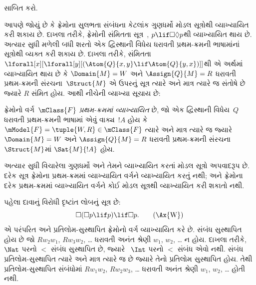 \begin{prob}
   સાબિત કરો.
\end{prob}
\endgroup

\begingroup
\makeatletter{}\makeatother


\label{guunit:OLP-0424}


આપણે જોયું છે કે ફ્રેમોના સુલભતા સંબંધના કેટલાંક
ગુણધર્મો મોડલ સૂત્રોથી વ્યાખ્યાયિત કરી શકાય છે.
દાખલા તરીકે, ફ્રેમોની સંમિતતા સૂત્ર~,
$p \lif \Box\Diamond
p$થી વ્યાખ્યાયિત થાય છે. અત્યાર સુધી મળેલી બધી
શરતો એક દ્વિસ્થાની વિધેય ધરાવતી
પ્રથમ-ક્રમની ભાષામાંનાં સૂત્રોથી
વ્યક્ત કરી શકાય છે. દાખલા તરીકે, સંમિતતા
$\lforall[x][\lforall[y][(\Atom{Q}{x,y} \lif \Atom{Q}{y, x})]]$થી
એ અર્થમાં વ્યાખ્યાયિત થાય છે કે $\Domain{M} =
W$ અને $\Assign{Q}{M} = R$ ધરાવતી પ્રથમ-ક્રમની
સંરચના~$\Struct{M}$ એ ઉપરનું સૂત્ર ત્યારે અને
માત્ર ત્યારે જ સંતોષે છે જ્યારે $R$ સંમિત હોય.
આથી નીચેની વ્યાખ્યા સૂચાય છે:

\begin{defn}
  ફ્રેમોનો વર્ગ~$\mClass{F}$ \emph{પ્રથમ-ક્રમમાં વ્યાખ્યાયિત}
  છે, જો એક દ્વિસ્થાની વિધેય~$Q$ ધરાવતી
  પ્રથમ-ક્રમની ભાષામાં એવું વાક્ય~$!A$
  હોય કે $\mModel{F} =
  \tuple{W, R} \in \mClass{F}$ ત્યારે અને માત્ર ત્યારે જ
  જ્યારે $\Domain{M} = W$ અને $\Assign{Q}{M}
  = R$ ધરાવતી પ્રથમ-ક્રમની સંરચના~$\Struct{M}$માં
  $\Sat{M}{!A}$ હોય.
\end{defn}

અત્યાર સુધી વિચારેલા ગુણધર્મો અને તેમને વ્યાખ્યાયિત
કરતાં મોડલ સૂત્રો અપવાદરૂપ છે. દરેક
સૂત્ર ફ્રેમોના પ્રથમ-ક્રમમાં વ્યાખ્યાયિત વર્ગને
વ્યાખ્યાયિત કરતું નથી; અને ફ્રેમોના દરેક પ્રથમ-ક્રમમાં
વ્યાખ્યાયિત વર્ગને કોઈ મોડલ સૂત્રથી વ્યાખ્યાયિત
કરી શકાતો નથી.

પહેલા દાવાનું વિરોધી દૃષ્ટાંત લોબનું સૂત્ર છે:
\begin{equation}
\Box(\Box p \lif p) \lif \Box p. \tag{\Ax{W}}
\end{equation}
 એ પરંપરિત અને પ્રતિલોમ-સુસ્થાપિત ફ્રેમોનો
વર્ગ વ્યાખ્યાયિત કરે છે. સંબંધ સુસ્થાપિત હોય છે જો
$Rw_2w_1$, $Rw_3w_2$, \dots{} ધરાવતી અનંત શ્રેણી
$w_1$, $w_2$, \dots{} ન હોય. દાખલા તરીકે,
~$\Nat$ પરનો $<$ સંબંધ સુસ્થાપિત છે, જ્યારે
~$\Int$ પરનો $<$ સંબંધ એવો નથી. સંબંધ
પ્રતિલોમ-સુસ્થાપિત ત્યારે અને માત્ર ત્યારે જ છે
જ્યારે તેનો પ્રતિલોમ સુસ્થાપિત હોય. તેથી
પ્રતિલોમ-સુસ્થાપિત સંબંધોમાં $Rw_1w_2$,
$Rw_2w_3$, \dots{} ધરાવતી અનંત શ્રેણી
$w_1$, $w_2$, \dots{} હોતી નથી.

